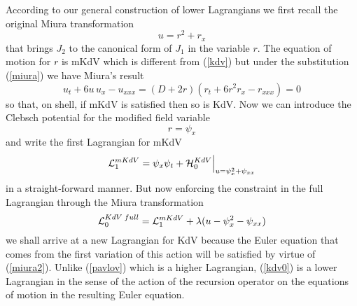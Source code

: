 \documentclass[a4paper,12pt]{article}
\begin{document}
According to our general construction of lower Lagrangians we
first recall the original Miura transformation
\begin{equation}
u = r^2 + r_{x} \label{miura}
\end{equation}
that brings $J_2$ to the canonical form of $J_1$ in the variable
$r$. The equation of motion for $r$ is mKdV which is different
from (\ref{kdv}) but under the substitution (\ref{miura}) we have
Miura's result
\begin{equation}
u_t + 6 u \, u_x - u_{xxx} = (D + 2 r ) \left(  r_t + 6 r^2 r_x -
r_{xxx} \right) =0 \label{miura2}
\end{equation}
so that, on shell, if mKdV is satisfied then so is KdV. Now we can
introduce the Clebsch potential for the modified field variable
\begin{equation}
r = \psi_x
\end{equation}
and write the first Lagrangian for mKdV
\begin{equation}
{\cal L}_1^{mKdV} = \psi_x \psi_t + {\cal
H}_0^{KdV}\Big|_{u=\psi_x^2+\psi_{xx} } \label{mkdvlag}
\end{equation}
in a straight-forward manner. But now enforcing the constraint in
the full Lagrangian through the Miura transformation
\begin{equation}
{\cal L}_{0}^{KdV \; full} = {\cal L}_1^{mKdV}  + \lambda ( u -
\psi_x^2 - \psi_{xx} ) \label{kdv0}
\end{equation}
we shall arrive at a new Lagrangian for KdV because the Euler
equation that comes from the first variation of this action will
be satisfied by virtue of (\ref{miura2}). Unlike (\ref{pavlov})
which is a higher Lagrangian, (\ref{kdv0}) is a lower Lagrangian
in the sense of the action of the recursion operator on the
equations of motion in the resulting Euler equation.
\end{document}

